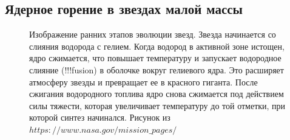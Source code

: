 \documentclass[%
bachelor,    %
natbib,      %
subf,        %
href,        %
colorlinks,  %
]{disser}
\begin{document}
\subsection{Ядерное горение в звездах малой массы}
\begin{figure}[h]
	\caption{Изображение ранних этапов эволюции звезд. Звезда начинается со слияния	водорода с гелием. Когда водород в активной зоне истощен, ядро сжимается, что повышает температуру и запускает водородное слияние (!!!fusion) в оболочке вокруг гелиевого ядра. Это расширяет атмосферу звезды и превращает ее в		красного гиганта. После сжигания водородного топлива ядро снова сжимается под 	действием силы тяжести, которая увеличивает температуру до той отметки, при которой синтез начинался. Рисунок из $https://www.nasa.gov/mission\_pages/$}
	\label{ris:3}
\end{figure}
\end{document}
